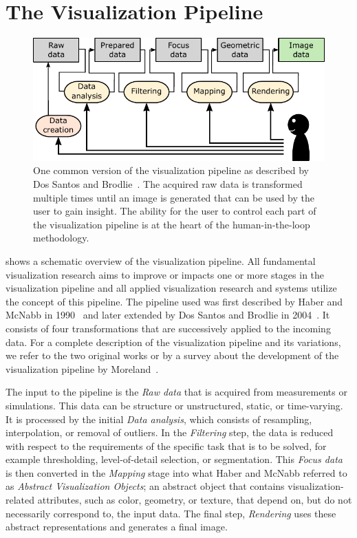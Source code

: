 \section{The Visualization Pipeline} \label{cha:intro:vp}
\begin{figure}
  \centering
  \includegraphics[width=\textwidth]{figures/intro/pipeline.pdf}
  \caption{One common version of the visualization pipeline as described by Dos Santos and Brodlie~\cite{dos2004gaining}.  The acquired raw data is transformed multiple times until an image is generated that can be used by the user to gain insight.  The ability for the user to control each part of the visualization pipeline is at the heart of the human-in-the-loop methodology.}
  \label{fig:intro:vp}
\end{figure}

 shows a schematic overview of the visualization pipeline.  All fundamental visualization research aims to improve or impacts one or more stages in the visualization pipeline and all applied visualization research and systems utilize the concept of this pipeline.  The pipeline used was first described by Haber and McNabb in 1990~\cite{haber1990visualization} and later extended by Dos Santos and Brodlie in 2004~\cite{dos2004gaining}.  It consists of four transformations that are successively applied to the incoming data.  For a complete description of the visualization pipeline and its variations, we refer to the two original works or by a survey about the development of the visualization pipeline by Moreland~\cite{moreland2013survey}.

The input to the pipeline is the \emph{Raw data} that is acquired from measurements or simulations.  This data can be structure or unstructured, static, or time-varying.  It is processed by the initial \emph{Data analysis}, which consists of resampling, interpolation, or removal of outliers.  In the \emph{Filtering} step, the data is reduced with respect to the requirements of the specific task that is to be solved, for example thresholding, level-of-detail selection, or segmentation.  This \emph{Focus data} is then converted in the \emph{Mapping} stage into what Haber and McNabb referred to as \emph{Abstract Visualization Objects}; an abstract object that contains visualization-related attributes, such as color, geometry, or texture, that depend on, but do not necessarily correspond to, the input data.  The final step, \emph{Rendering} uses these abstract representations and generates a final image.%

